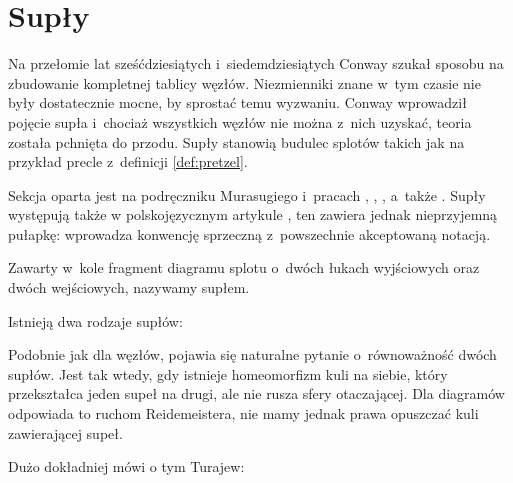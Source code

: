 \section{Supły}
\label{sec:tangle}
Na przełomie lat sześćdziesiątych i~siedemdziesiątych Conway szukał sposobu na zbudowanie kompletnej tablicy węzłów.
Niezmienniki znane w~tym czasie nie były dostatecznie mocne, by sprostać temu wyzwaniu.
Conway wprowadził pojęcie supła i~chociaż wszystkich węzłów nie można z~nich uzyskać, teoria została pchnięta do przodu.
Supły stanowią budulec splotów takich jak na przykład precle z~definicji \ref{def:pretzel}.

Sekcja oparta jest na podręczniku Murasugiego \cite{murasugi96} i~pracach \cite{conway70}, \cite{kauffman97}, \cite{kauffman04}, a~także \cite{schubert56}.
Supły występują także w polskojęzycznym artykule \cite{janiak04}, ten zawiera jednak nieprzyjemną pułapkę: wprowadza konwencję sprzeczną z~powszechnie akceptowaną notacją.

\begin{definition}[supeł]
    \label{def:tangle}
    Zawarty w~kole fragment diagramu splotu o~dwóch łukach wyjściowych oraz dwóch wejściowych, nazywamy supłem.
\end{definition}

Istnieją dwa rodzaje supłów:
\begin{comment}
\begin{figure}[H]
    \centering
    \begin{minipage}[b]{.48\linewidth}
        \[\LargeTangleAlternatingYes\]
        \subcaption{supeł naprzemienny}
    \end{minipage}
    \begin{minipage}[b]{.48\linewidth}
        \centering
        \[\LargeTangleAlternatingNo\]
        \subcaption{supeł sąsiądujący}
    \end{minipage}
\end{figure}
\end{comment}

Podobnie jak dla węzłów, pojawia się naturalne pytanie o~równoważność dwóch supłów.
Jest tak wtedy, gdy istnieje homeomorfizm kuli na siebie, który przekształca jeden supeł na drugi, ale nie rusza sfery otaczającej.
Dla diagramów odpowiada to ruchom Reidemeistera, nie mamy jednak prawa opuszczać kuli zawierającej supeł.

Dużo dokładniej mówi o tym Turajew:

